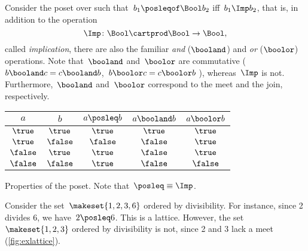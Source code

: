 \begin{example}
    Consider the poset over \Bool such that~$b_1 \posleqof\Bool b_2$ iff~$b_1 \Imp b_2$, that is, in addition to the operation
    \begin{equation*}
        \Imp\colon\Bool\cartprod \Bool\to\Bool,
    \end{equation*}
    called \emph{implication}, there are also the familiar \emph{and} ($\booland$) and \emph{or} ($\boolor$) operations.
    Note that~$\booland$ and~$\boolor$ are commutative ($b\booland c = c\booland b$,~$b\boolor c = c\boolor b$ ), whereas~$\Imp$ is not.
    Furthermore,~$\booland$ and~$\boolor$ correspond to the meet and the join, respectively.

    \begin{margintable}
        \centering
        \begin{tabular}{cc|ccc}
            $a$      & $b$      & $a \posleq  b$ & $a \booland b$ & $a \boolor b$ \\ \hline
            $\true$  & $\true$  & $\true$        & $\true$        & $\true$ \\
            $\true$  & $\false$ & $\false$       & $\false$       & $\true$ \\
            $\false$ & $\true$  & $\true$        & $\false$       & $\true$ \\
            $\false$ & $\false$ & $\true$        & $\false$       & $\false$
        \end{tabular}
        \caption{Properties of the \Bool poset.
            Note that~$\posleq \equiv \Imp$.
        }
        \label{tab:boolposet}
    \end{margintable}
\end{example}

\begin{example}
    Consider the set~$\makeset{1,2,3,6}$ ordered by divisibility.
    For instance, since 2 divides 6, we have~$2\posleq 6$.
    This is a lattice.
    However, the set~$\makeset{1,2,3}$ ordered by divisibility is not, since 2 and 3 lack a meet (\cref{fig:exlattice}).
\end{example}

